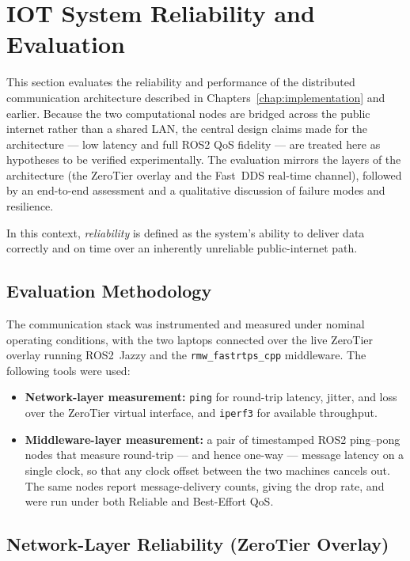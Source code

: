 

\section{IOT System Reliability and Evaluation}

This section evaluates the reliability and performance of the distributed communication architecture described in Chapters~\ref{chap:implementation} and earlier. Because the two computational nodes are bridged across the public internet rather than a shared LAN, the central design claims made for the architecture --- low latency and full ROS2 QoS fidelity --- are treated here as hypotheses to be verified experimentally. The evaluation mirrors the layers of the architecture (the ZeroTier overlay and the Fast~DDS real-time channel), followed by an end-to-end assessment and a qualitative discussion of failure modes and resilience.

In this context, \textit{reliability} is defined as the system's ability to deliver data correctly and on time over an inherently unreliable public-internet path.

\subsection{Evaluation Methodology}

The communication stack was instrumented and measured under nominal operating conditions, with the two laptops connected over the live ZeroTier overlay running ROS2~Jazzy and the \texttt{rmw\_fastrtps\_cpp} middleware. The following tools were used:

\begin{itemize}
    \item \textbf{Network-layer measurement:} \texttt{ping} for round-trip latency, jitter, and loss over the ZeroTier virtual interface, and \texttt{iperf3} for available throughput.
    \item \textbf{Middleware-layer measurement:} a pair of timestamped ROS2 ping--pong nodes that measure round-trip --- and hence one-way --- message latency on a single clock, so that any clock offset between the two machines cancels out. The same nodes report message-delivery counts, giving the drop rate, and were run under both Reliable and Best-Effort QoS.
\end{itemize}

\subsection{Network-Layer Reliability (ZeroTier Overlay)}

